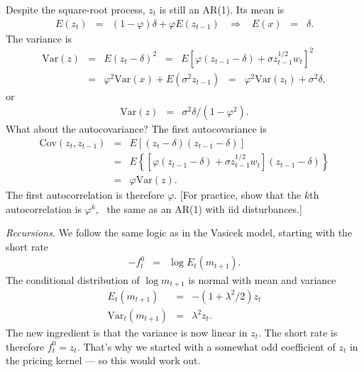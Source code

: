 \documentclass[11pt]{article}
\begin{document}
Despite the square-root process, $z_t$ is still an AR(1).
Its mean is
\begin{eqnarray*}
    E(z_t) &=& (1-\varphi) \delta + \varphi E(z_{t-1})
            \;\;\;\Rightarrow\;\;\; E(x) \;\;=\;\; \delta .
\end{eqnarray*}
The variance is
\begin{eqnarray*}
    \mbox{Var}(z) &=& E (z_t - \delta)^2
                \;\;=\;\; E \left[ \varphi (z_{t-1} - \delta) + \sigma z_{t-1}^{1/2} w_t \right]^2 \\
                &=& \varphi^2 \mbox{Var}(x) + E (\sigma^2 z_{t-1})
                \;\;=\;\;  \varphi^2 \mbox{Var}(z_{t}) + \sigma^2 \delta ,
\end{eqnarray*}
or
\begin{eqnarray*}
    \mbox{Var}(z) &=&   \sigma^2 \delta / (1-\varphi^2) .
\end{eqnarray*}
What about the autocovariance?
The first autocovariance is
\begin{eqnarray*}
    \mbox{Cov}(z_t,z_{t-1}) &=& E [(z_t - \delta)(z_{t-1} - \delta)]  \\
                &=& E  \left\{ [ \varphi (z_{t-1} - \delta) + \sigma z_{t-1}^{1/2} w_t ]
                (z_{t-1} - \delta) \right\} \\
                &=& \varphi \mbox{Var}(z) .
\end{eqnarray*}
The first autocorrelation is therefore $\varphi$.
[For practice, show that the $k$th autocorrelation is $\varphi^k$, \
the same as an AR(1) with iid disturbances.]

{\it Recursions.\/}
We follow the same logic as in the Vasicek model,
starting with the short rate
\begin{eqnarray*}
    - f^0_t &=&   \log E_t (m_{t+1} ).
\end{eqnarray*}
The conditional distribution of $\log m_{t+1}$ is
normal with mean and variance
\begin{eqnarray*}
    E_t (m_{t+1}) &=& - (1+\lambda^2/2) z_t \\
    \mbox{Var}_t (m_{t+1}) &=& \lambda^2 z_t .
\end{eqnarray*}
The new ingredient is that the variance is now linear in $z_t$.
The short rate is therefore
$ f^0_t = z_t $.
That's why we started with a somewhat odd coefficient of $z_t$
in the pricing kernel --- so this would work out.
\end{document}
